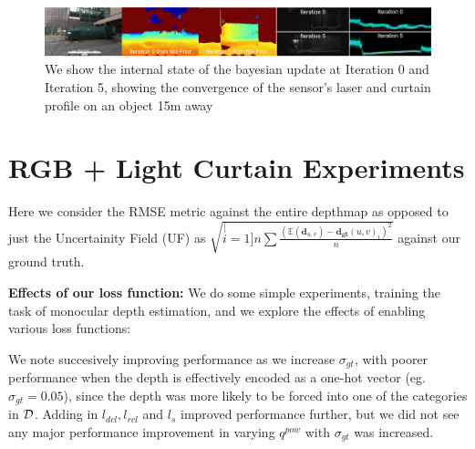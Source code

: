 \begin{figure}[h!]
  \includegraphics[width=1.0\textwidth]{figures/p6.png}
  \caption{We show the internal state of the bayesian update at Iteration 0 and Iteration 5, showing the convergence of the sensor's laser and curtain profile on an object 15m away}  
  \label{fig:images4} 
\end{figure}

\section{RGB + Light Curtain Experiments} 

Here we consider the RMSE metric against the entire depthmap as opposed to just the Uncertainity Field (UF) as $\sqrt{\stackrel[i=1]{n}{\sum}\frac{\left(\mathbb{E}\left(\mathbf{d}_{u,v}\right)-\mathbf{d_{gt}}(u,v)_{i}\right)^{2}}{n}}$ against our ground truth.

\textbf{Effects of our loss function:} We do some simple experiments, training the task of monocular depth estimation, and we explore the effects of enabling various loss functions:
\noindent
\begin{table}[h]
  \centering
  \caption{Effects of Soft Cross Entropy ($\sigma_{gt}$), Left/Right Consistency ($l_{dcl}, l_{rcl}$), Smoothness losses ()$l_{s}$) for the baseline of Monocular Depth Estimation only}
  \label{table:xx}
\end{table}

We note succesively improving performance as we increase $\sigma_{gt}$, with poorer performance when the depth is effectively encoded as a one-hot vector (eg. $\sigma_{gt}=0.05$), since the depth was more likely to be forced into one of the categories in $\mathcal{D}$. Adding in $l_{dcl}, l_{rcl}$ and $l_{s}$ improved performance further, but we did not see any major performance improvement in varying $q^{pow}$ with $\sigma_{gt}$ was increased.

